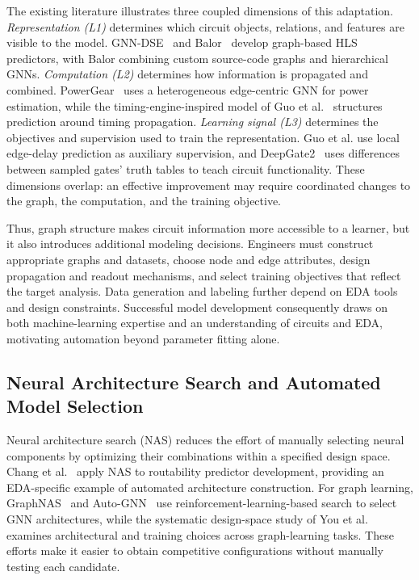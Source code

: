 The existing literature illustrates three coupled dimensions of this adaptation. \emph{Representation (L1)} determines which circuit objects, relations, and features are visible to the model. GNN-DSE~\cite{sohrabizadeh2022automated} and Balor~\cite{murphy2024balor} develop graph-based HLS predictors, with Balor combining custom source-code graphs and hierarchical GNNs. \emph{Computation (L2)} determines how information is propagated and combined. PowerGear~\cite{lin2022powergear} uses a heterogeneous edge-centric GNN for power estimation, while the timing-engine-inspired model of Guo et al.~\cite{guo2022timing} structures prediction around timing propagation. \emph{Learning signal (L3)} determines the objectives and supervision used to train the representation. Guo et al. use local edge-delay prediction as auxiliary supervision, and DeepGate2~\cite{shi2023deepgate2} uses differences between sampled gates' truth tables to teach circuit functionality. These dimensions overlap: an effective improvement may require coordinated changes to the graph, the computation, and the training objective.

Thus, graph structure makes circuit information more accessible to a learner, but it also introduces additional modeling decisions. Engineers must construct appropriate graphs and datasets, choose node and edge attributes, design propagation and readout mechanisms, and select training objectives that reflect the target analysis. Data generation and labeling further depend on EDA tools and design constraints. Successful model development consequently draws on both machine-learning expertise and an understanding of circuits and EDA, motivating automation beyond parameter fitting alone.

\subsection{Neural Architecture Search and Automated Model Selection}
\label{sec:automated_gnn_design}

Neural architecture search (NAS) reduces the effort of manually selecting neural components by optimizing their combinations within a specified design space. Chang et al.~\cite{chang2020automatic} apply NAS to routability predictor development, providing an EDA-specific example of automated architecture construction. For graph learning, GraphNAS~\cite{gao2019graphnas} and Auto-GNN~\cite{zhou2022auto} use reinforcement-learning-based search to select GNN architectures, while the systematic design-space study of You et al.~\cite{you2020design} examines architectural and training choices across graph-learning tasks. These efforts make it easier to obtain competitive configurations without manually testing each candidate.

